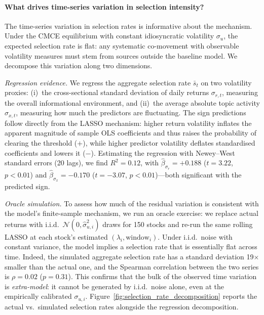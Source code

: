 \documentclass[11pt]{article}
\begin{document}
\paragraph{What drives time-series variation in selection intensity?}
The time-series variation in selection rates is informative about the mechanism.
Under the CMCE equilibrium with constant idiosyncratic volatility $\sigma_u$, the
expected selection rate is flat: any systematic co-movement with observable volatility
measures must stem from sources outside the baseline model.
We decompose this variation along two dimensions.

\emph{Regression evidence.}
We regress the aggregate selection rate $\bar{s}_t$ on two volatility proxies: (i)~the
cross-sectional standard deviation of daily returns $\sigma_{r,t}$, measuring the
overall informational environment, and (ii)~the average absolute topic activity
$\sigma_{x,t}$, measuring how much the predictors are fluctuating.
The sign predictions follow directly from the LASSO mechanism: higher return volatility
inflates the apparent magnitude of sample OLS coefficients and thus raises the
probability of clearing the threshold ($+$), while higher predictor volatility deflates
standardised coefficients and lowers it ($-$).
Estimating the regression with Newey--West standard errors (20 lags), we find
$R^2 = 0.12$, with $\hat\beta_{\sigma_r} = +0.188$ ($t = 3.22$, $p < 0.01$) and
$\hat\beta_{\sigma_x} = -0.170$ ($t = -3.07$, $p < 0.01$)---both significant with
the predicted sign.

\emph{Oracle simulation.}
To assess how much of the residual variation is consistent with the model's finite-sample
mechanism, we run an oracle exercise: we replace actual returns with i.i.d.\
$\mathcal{N}(0, \hat\sigma_{u,i}^2)$ draws for 150 stocks and re-run the same rolling
LASSO at each stock's estimated $(\lambda_i, \text{window}_i)$.
Under i.i.d.\ noise with constant variance, the model implies a selection rate that is
essentially flat across time.
Indeed, the simulated aggregate selection rate has a standard deviation 19$\times$ smaller
than the actual one, and the Spearman correlation between the two series is $\rho = 0.02$
($p = 0.31$).
This confirms that the bulk of the observed time variation is \emph{extra-model}: it
cannot be generated by i.i.d.\ noise alone, even at the empirically calibrated
$\sigma_{u,i}$.
Figure~\ref{fig:selection_rate_decomposition} reports the actual vs.\ simulated selection
rates alongside the regression decomposition.
\end{document}
